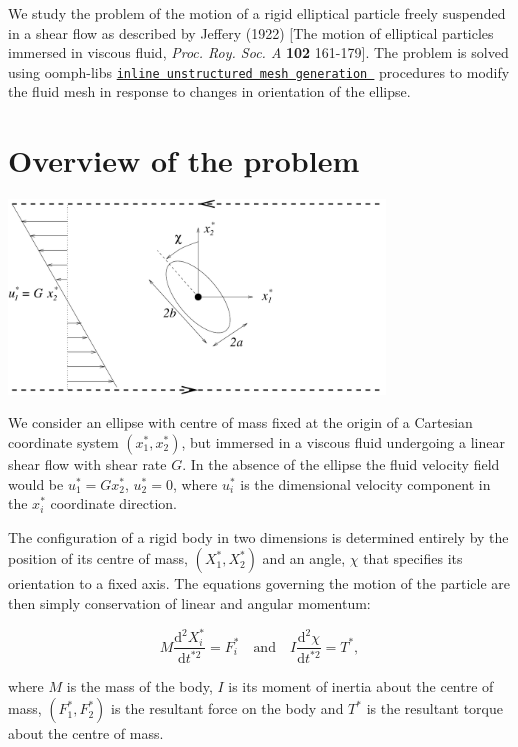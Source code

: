 We study the problem of the motion of a rigid elliptical particle freely suspended in a shear flow as described by Jeffery (1922) \mbox{[}The motion of elliptical particles immersed in viscous fluid, {\itshape  Proc. Roy. Soc. A } {\bfseries  102 } 161-\/179\mbox{]}. The problem is solved using {\ttfamily oomph-\/lib\textquotesingle{}s} \href{../../../../doc/meshes/mesh_from_inline_triangle/html/index.html}{\tt inline unstructured mesh generation } procedures to modify the fluid mesh in response to changes in orientation of the ellipse.\hypertarget{index_overview}{}\section{Overview of the problem}\label{index_overview}
 
\begin{DoxyImage}
\includegraphics[width=0.75\textwidth]{jeff_sketch}
\end{DoxyImage}


We consider an ellipse with centre of mass fixed at the origin of a Cartesian coordinate system $ (x_{1}^{*}, x_{2}^{*}) $, but immersed in a viscous fluid undergoing a linear shear flow with shear rate $ G $. In the absence of the ellipse the fluid velocity field would be $ u^{*}_{1} = Gx^{*}_{2} $, $ u^{*}_{2} = 0 $, where $ u^{*}_{i} $ is the dimensional velocity component in the $ x^{*}_{i} $ coordinate direction.

The configuration of a rigid body in two dimensions is determined entirely by the position of its centre of mass, $(X^{*}_{1},X^{*}_{2})$ and an angle, $\chi$ that specifies its orientation to a fixed axis. The equations governing the motion of the particle are then simply conservation of linear and angular momentum\+: \begin{center} \[ M \frac{\mbox{d}^{2} X^{*}_{i}}{\mbox{d} t^{*2}} = F^{*}_{i} \quad \mbox{and} \quad I \frac{\mbox{d}^{2} \chi}{\mbox{d} t^{*2}} = T^{*}, \] \end{center}  where $M$ is the mass of the body, $I$ is its moment of inertia about the centre of mass, $(F^{*}_{1},F^{*}_{2})$ is the resultant force on the body and $T^{*}$ is the resultant torque about the centre of mass.

